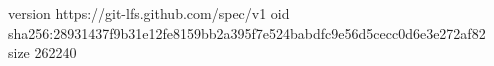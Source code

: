 version https://git-lfs.github.com/spec/v1
oid sha256:28931437f9b31e12fe8159bb2a395f7e524babdfc9e56d5cecc0d6e3e272af82
size 262240
